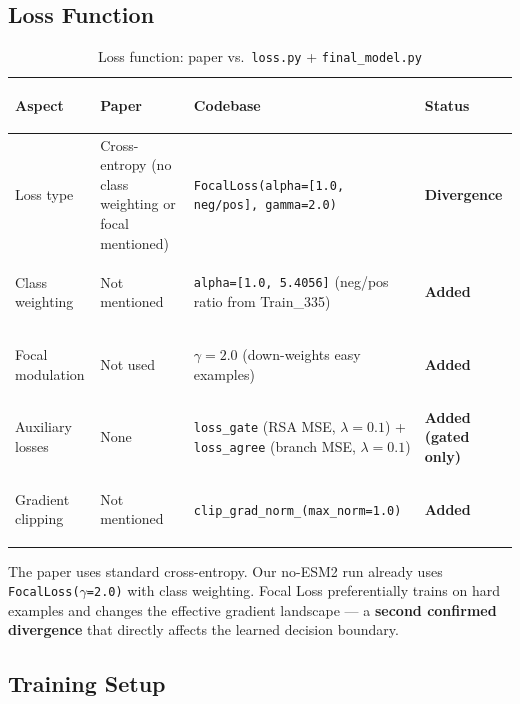 \documentclass[10pt, a4paper]{article}
\newcommand{\mismatch}[1]{\textcolor{warnorange}{\textbf{#1}}}
\newcommand{\warn}[1]{\textcolor{warnorange}{\textbf{#1}}}
\newcommand{\code}[1]{\texttt{\small #1}}
\begin{document}
\subsection{Loss Function}

\begin{table}[ht]
\caption{Loss function: paper vs.\ \code{loss.py} + \code{final\_model.py}}
\label{tab:loss}
\begin{tabularx}{\linewidth}{>{\footnotesize\bfseries\raggedright\arraybackslash}p{2.5cm}
    Y Y
    >{\footnotesize\centering\arraybackslash}p{2.4cm}}
\toprule
\normalsize\textbf{Aspect} & \normalsize\textbf{Paper} & \normalsize\textbf{Codebase} & \normalsize\textbf{Status} \\
\midrule
Loss type &
  Cross-entropy (no class weighting or focal mentioned) &
  \code{FocalLoss(alpha=[1.0, neg/pos], gamma=2.0)} &
  \mismatch{\textbf{Divergence}} \\
Class weighting &
  Not mentioned &
  \code{alpha=[1.0, 5.4056]} (neg/pos ratio from Train\_335) &
  \mismatch{Added} \\
Focal modulation &
  Not used &
  $\gamma=2.0$ (down-weights easy examples) &
  \mismatch{Added} \\
Auxiliary losses &
  None &
  \code{loss\_gate} (RSA MSE, $\lambda=0.1$) + \code{loss\_agree} (branch MSE, $\lambda=0.1$) &
  \mismatch{Added (gated only)} \\
Gradient clipping &
  Not mentioned &
  \code{clip\_grad\_norm\_(max\_norm=1.0)} &
  \mismatch{Added} \\
\bottomrule
\end{tabularx}
\end{table}

\begin{tcolorbox}[colback=warnbg, colframe=warnorange, title=\warn{Loss Divergence Note}]
The paper uses standard cross-entropy.
Our no-ESM2 run already uses \code{FocalLoss($\gamma$=2.0)} with class weighting.
Focal Loss preferentially trains on hard examples and changes the effective gradient landscape ---
a \textbf{second confirmed divergence} that directly affects the learned decision boundary.
\end{tcolorbox}

\subsection{Training Setup}
\end{document}
